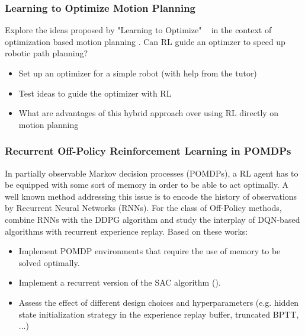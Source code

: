 \documentclass[a4paper]{article}
\begin{document}
\subsubsection{Learning to Optimize Motion Planning}
Explore the ideas proposed by "Learning to Optimize" ~\cite{LiM16b} in the context of optimization based motion planning \cite{Zucker2013}. Can RL guide an optimzer to speed up robotic path planning?
\begin{itemize}
  \item Set up an optimizer for a simple robot (with help from the tutor)
  \item Test ideas to guide the optimizer with RL
  \item What are advantages of this hybrid approach over using RL directly on motion planning
\end{itemize}

\subsubsection{Recurrent Off-Policy Reinforcement Learning in POMDPs}
In partially observable Markov decision processes (POMDPs), a RL agent has to be equipped with some sort of memory in order to be able to act optimally. A well known method addressing this issue is to encode the history of observations by Recurrent Neural Networks (RNNs).
For the class of Off-Policy methods, \cite{heess2015memory} combine RNNs with the DDPG algorithm and \cite{kapturowski2018recurrent} study the interplay of DQN-based algorithms with recurrent experience replay.
Based on these works:
\begin{itemize}
  \item Implement POMDP environments that require the use of memory to be solved optimally.
  \item Implement a recurrent version of the SAC algorithm (\cite{Haarnoja2018a}).
  \item Assess the effect of different design choices and hyperparameters (e.g. hidden state initialization strategy in the experience replay buffer, truncated BPTT, ...)
\end{itemize}
\end{document}
